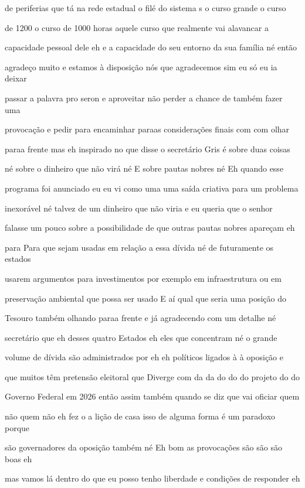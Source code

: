 \documentclass[a4paper,12pt]{article}
\begin{document}
de periferias que tá na rede estadual o filé do sistema s o curso grande o curso

de 1200 o curso de 1000 horas aquele curso que realmente vai alavancar a

capacidade pessoal dele eh e a capacidade do seu entorno da sua família né então

agradeço muito e estamos à disposição nós que agradecemos sim eu só eu ia deixar

passar a palavra pro seron e aproveitar não perder a chance de também fazer uma

provocação e pedir para encaminhar paraas considerações finais com com olhar

paraa frente mas eh inspirado no que disse o secretário Gris é sobre duas coisas

né sobre o dinheiro que não virá né E sobre pautas nobres né Eh quando esse

programa foi anunciado eu eu vi como uma uma saída criativa para um problema

inexorável né talvez de um dinheiro que não viria e eu queria que o senhor

falasse um pouco sobre a possibilidade de que outras pautas nobres apareçam eh

para Para que sejam usadas em relação a essa dívida né de futuramente os estados

usarem argumentos para investimentos por exemplo em infraestrutura ou em

preservação ambiental que possa ser usado E aí qual que seria uma posição do

Tesouro também olhando paraa frente e já agradecendo com um detalhe né

secretário que eh desses quatro Estados eh eles que concentram né o grande

volume de dívida são administrados por eh eh políticos ligados à à oposição e

que muitos têm pretensão eleitoral que Diverge com da da do do do projeto do do

Governo Federal em 2026 então assim também quando se diz que vai oficiar quem

não quem não eh fez o a lição de casa isso de alguma forma é um paradoxo porque

são governadores da oposição também né Eh bom as provocações são são são boas eh

mas vamos lá dentro do que eu posso tenho liberdade e condições de responder eh
\end{document}
